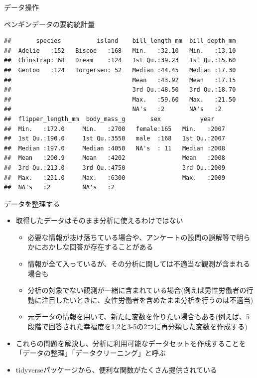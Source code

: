 \documentclass[
  ignorenonframetext,
]{beamer}
\providecommand{\tightlist}{%
  \setlength{\itemsep}{0pt}\setlength{\parskip}{0pt}}
\begin{document}
\begin{frame}[fragile]{データ操作}
\begin{block}{ペンギンデータの要約統計量}
\begin{verbatim}
##       species          island    bill_length_mm  bill_depth_mm  
##  Adelie   :152   Biscoe   :168   Min.   :32.10   Min.   :13.10  
##  Chinstrap: 68   Dream    :124   1st Qu.:39.23   1st Qu.:15.60  
##  Gentoo   :124   Torgersen: 52   Median :44.45   Median :17.30  
##                                  Mean   :43.92   Mean   :17.15  
##                                  3rd Qu.:48.50   3rd Qu.:18.70  
##                                  Max.   :59.60   Max.   :21.50  
##                                  NA's   :2       NA's   :2      
##  flipper_length_mm  body_mass_g       sex           year     
##  Min.   :172.0     Min.   :2700   female:165   Min.   :2007  
##  1st Qu.:190.0     1st Qu.:3550   male  :168   1st Qu.:2007  
##  Median :197.0     Median :4050   NA's  : 11   Median :2008  
##  Mean   :200.9     Mean   :4202                Mean   :2008  
##  3rd Qu.:213.0     3rd Qu.:4750                3rd Qu.:2009  
##  Max.   :231.0     Max.   :6300                Max.   :2009  
##  NA's   :2         NA's   :2
\end{verbatim}
\end{block}

\begin{block}{データを整理する}
\protect\hypertarget{ux30c7ux30fcux30bfux3092ux6574ux7406ux3059ux308b}{}
\begin{itemize}
\tightlist
\item
  取得したデータはそのまま分析に使えるわけではない

  \begin{itemize}
  \tightlist
  \item
    必要な情報が抜け落ちている場合や、アンケートの設問の誤解等で明らかにおかしな回答が存在することがある
  \item
    情報が全て入っているが、その分析に関しては不適当な観測が含まれる場合も
  \item
    分析の対象でない観測が一緒に含まれている場合(例えば男性労働者の行動に注目したいときに、女性労働者を含めたまま分析を行うのは不適当)
  \item
    元データの情報を用いて、新たに変数を作りたい場合もある(例えば、5段階で回答された幸福度を1,2と3-5の2つに再分類した変数を作成する)
  \end{itemize}
\item
  これらの問題を解決し、分析に利用可能なデータセットを作成することを「データの整理」「データクリーニング」と呼ぶ
\item
  tidyverseパッケージから、便利な関数がたくさん提供されている


\end{itemize}
\end{block}
\end{frame}
\end{document}

